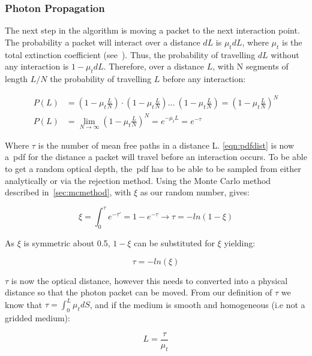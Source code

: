 \subsubsection*{Photon Propagation}\label{sec:photmove}

The next step in the algorithm is moving a packet to the next interaction point. The probability a packet will interact over a distance $dL$ is $\mu_tdL$, where $\mu_t$ is the total extinction coefficient (see~). Thus, the probability of travelling $dL$ without any interaction is $1-\mu_tdL$. Therefore, over a distance $L$, with N segments of length $L/N$ the probability of travelling $L$ before any interaction:

\begin{align}
P(L) &= (1-\mu_t\frac{L}{N}) \cdot (1-\mu_t\frac{L}{N}) ...\ (1-\mu_t\frac{L}{N}) = (1-\mu_t\frac{L}{N})^N \\
P(L) &= \lim_{N \to \infty}(1-\mu_t\frac{L}{N})^N=e^{-\mu_tL}=e^{-\tau}\label{eqn:pdfdist}
\end{align}

Where $\tau$ is the number of mean free paths in a distance L. \cref{eqn:pdfdist} is now a~\gls*{pdf} for the distance a packet will travel before an interaction occurs. To be able to get a random optical depth, the~\gls*{pdf} has to be able to be sampled from either analytically or via the rejection method.
Using the Monte Carlo method described in~\cref{sec:mcmethod}, with $\xi$ as our random number, gives:

\begin{equation}
\xi=\int_{0}^{\tau}e^{-\tau'}=1-e^{-\tau}\rightarrow \tau=-ln(1-\xi)
\end{equation}

As $\xi$ is symmetric about 0.5, $1-\xi$ can be substituted for $\xi$ yielding:

\begin{equation}
\tau=-ln(\xi)\label{eqn:taueqn}
\end{equation} 

$\tau$ is now the optical distance, however this needs to converted into a physical distance so that the photon packet can be moved. From our definition of $\tau$ we know that $\tau=\int_0^L\mu_tdS$, and if the medium is smooth and homogeneous (i.e not a gridded medium): 

\begin{equation}
L=\frac{\tau}{\mu_t}\label{eqn:physicaldist}
\end{equation}

